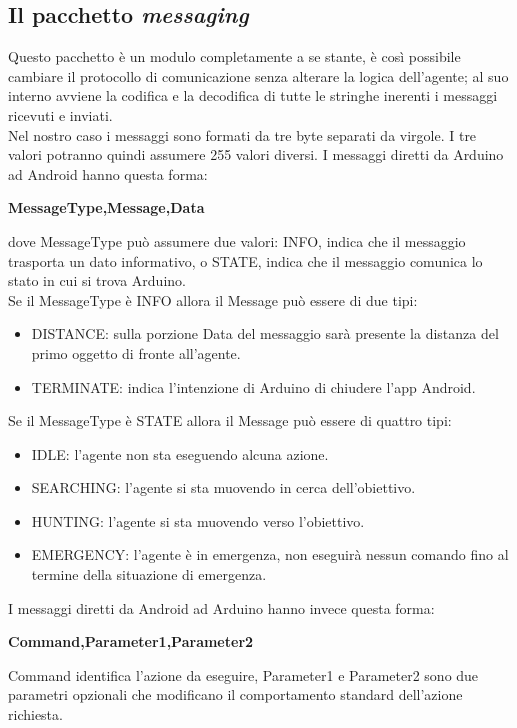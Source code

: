 \subsection{Il pacchetto \textit{messaging}}
Questo pacchetto è un modulo completamente a se stante, è così possibile cambiare il
protocollo di comunicazione senza alterare la logica dell'agente; al suo interno 
avviene la codifica e la decodifica di tutte le stringhe inerenti i messaggi ricevuti e 
inviati.
\\Nel nostro caso i messaggi sono formati da tre byte separati da virgole. I tre 
valori potranno quindi assumere 255 valori diversi.
I messaggi diretti da Arduino ad Android hanno questa forma:
\begin{center}
\textbf{MessageType,Message,Data}
\end{center}
dove MessageType può assumere due valori: INFO, indica che il messaggio trasporta un
dato informativo, o STATE, indica che il messaggio comunica lo stato in cui si trova Arduino.
\\Se il MessageType è INFO allora il Message può essere di due tipi: 
\begin{itemize}\item DISTANCE: sulla porzione Data del messaggio sarà presente 
la distanza del primo oggetto di fronte all'agente.
\item TERMINATE: indica l'intenzione di Arduino di chiudere l'app Android.
\end{itemize}
Se il MessageType è STATE allora il Message può essere di quattro tipi: 
\begin{itemize}
	\item IDLE: l'agente non sta eseguendo alcuna azione.
	\item SEARCHING: l'agente si sta muovendo in cerca dell'obiettivo.
	\item HUNTING: l'agente si sta muovendo verso l'obiettivo.
	\item EMERGENCY: l'agente è in emergenza, non eseguirà nessun comando fino al 
	termine della situazione di emergenza. 
\end{itemize}
I messaggi diretti da Android ad Arduino hanno invece questa forma:
\begin{center}
\textbf{Command,Parameter1,Parameter2}
\end{center}
Command identifica l'azione da eseguire, Parameter1 e Parameter2 sono due parametri opzionali
che modificano il comportamento standard dell'azione richiesta.

